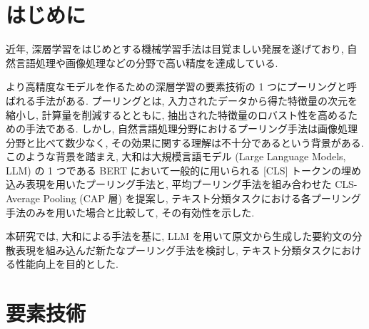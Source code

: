\documentclass[twocolumn]{jarticle}
\begin{document}


\renewcommand{\thefootnote}{*\arabic{footnote}}

\section{はじめに}
近年, 深層学習をはじめとする機械学習手法は目覚ましい発展を遂げており, 自然言語処理や画像処理などの分野で高い精度を達成している.

より高精度なモデルを作るための深層学習の要素技術の 1 つにプーリングと呼ばれる手法がある. プーリングとは, 入力されたデータから得た特徴量の次元を縮小し, 計算量を削減するとともに, 抽出された特徴量のロバスト性を高めるための手法である. しかし, 自然言語処理分野におけるプーリング手法は画像処理分野と比べて数少なく, その効果に関する理解は不十分であるという背景がある. このような背景を踏まえ, 大和\cite{yamato}は大規模言語モデル (Large Language Models, LLM) の 1 つである BERT において一般的に用いられる [CLS] トークンの埋め込み表現を用いたプーリング手法と, 平均プーリング手法を組み合わせた CLS-Average Pooling (CAP 層) を提案し, テキスト分類タスクにおける各プーリング手法のみを用いた場合と比較して, その有効性を示した.

本研究では, 大和による手法を基に, LLM を用いて原文から生成した要約文の分散表現を組み込んだ新たなプーリング手法を検討し, テキスト分類タスクにおける性能向上を目的とした.


\section{要素技術}
\end{document}
